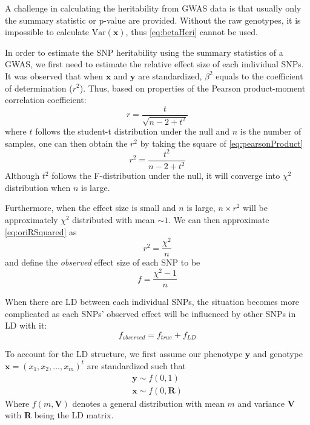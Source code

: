 			A challenge in calculating the heritability from \gls{GWAS} data is that usually only the summary statistic or p-value are provided.
			Without the raw genotypes, it is impossible to calculate $\mathrm{Var}(\boldsymbol{x})$, thus \cref{eq:betaHeri} cannot be used. 
			
			In order to estimate the \gls{SNP} heritability using the summary statistics of a \gls{GWAS}, we first need to estimate the relative effect size of each individual \glspl{SNP}. 
			It was observed that when $\boldsymbol{x}$ and $\boldsymbol{y}$ are standardized, $\beta^2$ equals to the coefficient of determination ($r^2$). 
			Thus, based on properties of the Pearson product-moment correlation coefficient:
			\begin{equation}
				r = \frac{t}{\sqrt{n-2+t^2}}
				\label{eq:pearsonProduct}
			\end{equation}
			where $t$ follows the student-t distribution under the null and $n$ is the number of samples, one can then obtain the $r^2$ by taking the square of \cref{eq:pearsonProduct}
			\begin{equation}
				r^2 = \frac{t^2}{n-2+t^2}
				\label{eq:oriRSquared}
			\end{equation}
			Although $t^2$ follows the F-distribution under the null, it will converge into $\chi^2$ distribution when $n$ is large.
			
			Furthermore, when the effect size is small and $n$ is large, $n\times r^2$ will be approximately $\chi^2$ distributed with mean $\sim 1$. 
			We can then approximate \cref{eq:oriRSquared} as
			\begin{equation}
				r^2= \frac{\chi^2}{n}
				\label{eq:approxChi}
			\end{equation}
			and define the \emph{observed} effect size of each \gls{SNP} to be
			\begin{equation}
			f=\frac{\chi^2-1}{n}
			\label{eq:observedEffect}
			\end{equation}
			
			When there are \gls{LD} between each individual \glspl{SNP}, the situation becomes more complicated as each \glspl{SNP}' observed effect will be influenced by other \glspl{SNP} in \gls{LD} with it:
			\begin{equation}
			f_{observed} = f_{true}+f_{LD}
			\label{eq:conceptF}
			\end{equation}
			
			To account for the \gls{LD} structure, we first assume our phenotype $\boldsymbol{y}$ and genotype $\boldsymbol{x}=(x_1,x_2,\dots,x_m)^t$ are standardized such that
			\begin{align*}
				\boldsymbol{y}\sim f(0,1) \\
				\boldsymbol{x}\sim f(0,\boldsymbol{R})
			\end{align*}
			Where $f(m, \boldsymbol{V})$ denotes a general distribution with mean $m$ and variance $\boldsymbol{V}$ with $\boldsymbol{R}$ being the \gls{LD} matrix.
			
